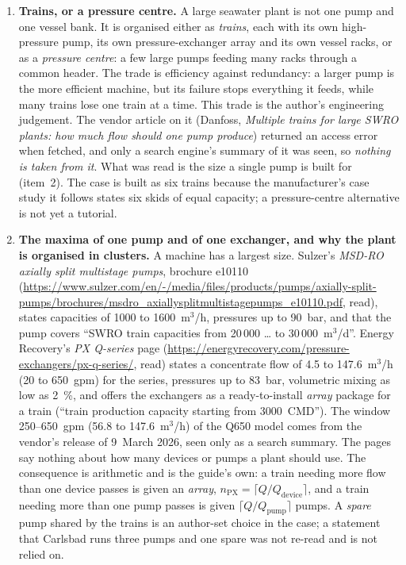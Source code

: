 \documentclass[11pt,a4paper]{article}
\begin{document}
\begin{enumerate}
\item \textbf{Trains, or a pressure centre.}  A large seawater plant is not
one pump and one vessel bank.  It is organised either as \emph{trains}, each
with its own high-pressure pump, its own pressure-exchanger array and its own
vessel racks, or as a \emph{pressure centre}: a few large pumps feeding many
racks through a common header.  The trade is efficiency against redundancy: a
larger pump is the more efficient machine, but its failure stops everything
it feeds, while many trains lose one train at a time.  This trade is the
author's engineering judgement.  The vendor article on it (Danfoss,
\emph{Multiple trains for large SWRO plants: how much flow should one pump
produce}) returned an access error when fetched, and only a search engine's
summary of it was seen, so \emph{nothing is taken from it}.  What was read is
the size a single pump is built for (item~2).  The case
 is built as six trains because the manufacturer's
case study it follows states six skids of equal capacity; a pressure-centre
alternative is not yet a tutorial.

\item \textbf{The maxima of one pump and of one exchanger, and why the plant
is organised in clusters.}  A machine has a largest size.  Sulzer's
\emph{MSD-RO axially split multistage pumps}, brochure e10110
(\url{https://www.sulzer.com/en/-/media/files/products/pumps/axially-split-pumps/brochures/msdro_axiallysplitmultistagepumps_e10110.pdf},
read), states capacities of 1000 to 1600~m$^3$/h, pressures up to 90~bar, and
that the pump covers ``SWRO train capacities from 20\,000 \dots{} to
30\,000~m$^3$/d''.  Energy Recovery's \emph{PX Q-series} page
(\url{https://energyrecovery.com/pressure-exchangers/px-q-series/}, read)
states a concentrate flow of 4.5 to 147.6~m$^3$/h (20 to 650~gpm) for the
series, pressures up to 83~bar, volumetric mixing as low as 2~\%, and offers
the exchangers as a ready-to-install \emph{array} package for a train
(``train production capacity starting from 3000~CMD'').  The window
250--650~gpm (56.8 to 147.6~m$^3$/h) of the Q650 model comes from the
vendor's release of 9~March 2026, seen only as a search summary.  The pages
say nothing about how many devices or pumps a plant should use.  The
consequence is arithmetic and is the guide's own: a train needing more flow
than one device passes is given an \emph{array},
$n_{\mathrm{PX}}=\lceil Q/Q_{\mathrm{device}}\rceil$, and a train needing more
than one pump passes is given $\lceil Q/Q_{\mathrm{pump}}\rceil$ pumps.  A
\emph{spare} pump shared by the trains is an author-set choice in the case;
a statement that Carlsbad runs three pumps and one spare was not re-read and
is not relied on.


\end{enumerate}
\end{document}
